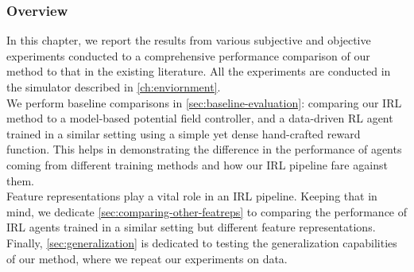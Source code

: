\label{ch:6}
\subsubsection*{Overview}
In this chapter, we report the results from various subjective and objective experiments conducted to  a comprehensive performance comparison of our method to that in the existing literature. All the experiments are conducted in the simulator described in \autoref{ch:enviornment}. \\
We perform baseline comparisons in \autoref{sec:baseline-evaluation}: comparing our IRL method to a model-based potential field controller, and a data-driven RL agent trained in a similar setting using a simple yet dense hand-crafted reward function. This helps in demonstrating the difference in the performance of agents coming from different training methods and how our IRL pipeline fare against them.\\
 Feature representations play a vital role in an IRL pipeline. Keeping that in mind, we dedicate \autoref{sec:comparing-other-featreps} to comparing the performance of IRL agents trained in a similar setting but different feature representations.\\
 Finally, \autoref{sec:generalization} is dedicated to testing the generalization capabilities of our method, where we repeat our experiments on  data.

%

